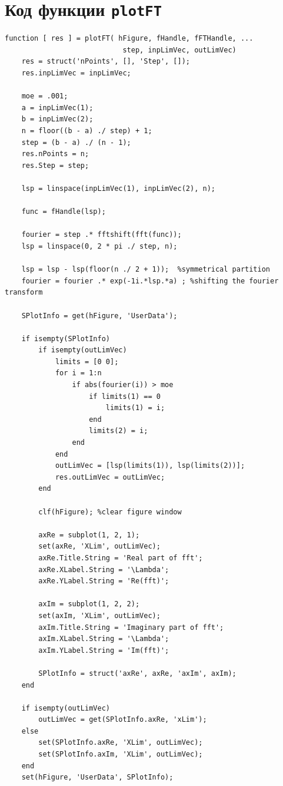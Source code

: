 \documentclass[11pt, oneside, draft]{article}
\numberwithin{equation}{section}
\begin{document}
    \section{Код функции \texttt{plotFT}} %
    \label{lst:code}
    \begin{verbatim}
function [ res ] = plotFT( hFigure, fHandle, fFTHandle, ...
                            step, inpLimVec, outLimVec)
    res = struct('nPoints', [], 'Step', []);
    res.inpLimVec = inpLimVec;

    moe = .001;
    a = inpLimVec(1);
    b = inpLimVec(2);
    n = floor((b - a) ./ step) + 1;
    step = (b - a) ./ (n - 1);
    res.nPoints = n;
    res.Step = step;

    lsp = linspace(inpLimVec(1), inpLimVec(2), n);

    func = fHandle(lsp);

    fourier = step .* fftshift(fft(func));
    lsp = linspace(0, 2 * pi ./ step, n);

    lsp = lsp - lsp(floor(n ./ 2 + 1));  %symmetrical partition
    fourier = fourier .* exp(-1i.*lsp.*a) ; %shifting the fourier transform

    SPlotInfo = get(hFigure, 'UserData');

    if isempty(SPlotInfo)
        if isempty(outLimVec)
            limits = [0 0];
            for i = 1:n
                if abs(fourier(i)) > moe
                    if limits(1) == 0
                        limits(1) = i;
                    end
                    limits(2) = i;
                end
            end
            outLimVec = [lsp(limits(1)), lsp(limits(2))];
            res.outLimVec = outLimVec;
        end
    
        clf(hFigure); %clear figure window
    
        axRe = subplot(1, 2, 1);
        set(axRe, 'XLim', outLimVec);
        axRe.Title.String = 'Real part of fft';
        axRe.XLabel.String = '\Lambda';
        axRe.YLabel.String = 'Re(fft)';
    
        axIm = subplot(1, 2, 2);
        set(axIm, 'XLim', outLimVec);
        axIm.Title.String = 'Imaginary part of fft';
        axIm.XLabel.String = '\Lambda';
        axIm.YLabel.String = 'Im(fft)';
   
        SPlotInfo = struct('axRe', axRe, 'axIm', axIm);
    end

    if isempty(outLimVec)
        outLimVec = get(SPlotInfo.axRe, 'xLim');
    else
        set(SPlotInfo.axRe, 'XLim', outLimVec);
        set(SPlotInfo.axIm, 'XLim', outLimVec);
    end
    set(hFigure, 'UserData', SPlotInfo);


\end{verbatim}
\end{document}
